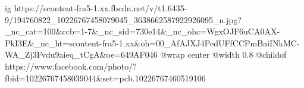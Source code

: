  
 
 
 
 

\ifcmt
  ig https://scontent-fra5-1.xx.fbcdn.net/v/t1.6435-9/194760822_10226767458079045_3638662587922926095_n.jpg?_nc_cat=100&ccb=1-7&_nc_sid=730e14&_nc_ohc=WgxOJF6uCA0AX-PkI3E&_nc_ht=scontent-fra5-1.xx&oh=00_AfAJXJ4PedUFfCCPmBaiINkMC-WA_Zj3Fvdu9aieq_tCgA&oe=649AF046
  @wrap center
  @width 0.8
  @childof https://www.facebook.com/photo/?fbid=10226767458039044&set=pcb.10226767460519106
\fi
